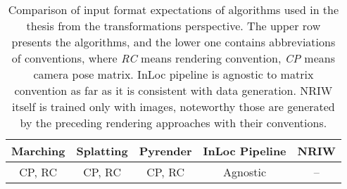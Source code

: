 \begin{table}[t]
\caption[Comparison of input format expectations of algorithms used in the
thesis from the transformations perspective]{Comparison of input format
expectations of algorithms used in the
thesis from the transformations perspective. The upper row presents the algorithms, and
the lower one contains abbreviations of conventions, where \emph{RC} means rendering
convention, \emph{CP} means camera pose matrix. InLoc pipeline is agnostic to matrix
convention as far as it is consistent with data generation. NRIW itself is trained only
with images, noteworthy those are generated by the preceding rendering approaches with
their conventions.}
\centering
    \begin{tabular}{c c c c c}
    \toprule
    Marching & Splatting & Pyrender & InLoc Pipeline & NRIW\\
    \midrule
    CP, RC & CP, RC & CP, RC & Agnostic & -- \\
    \bottomrule
    \end{tabular}
\label{tab:agorithm_conventions}
\end{table}
